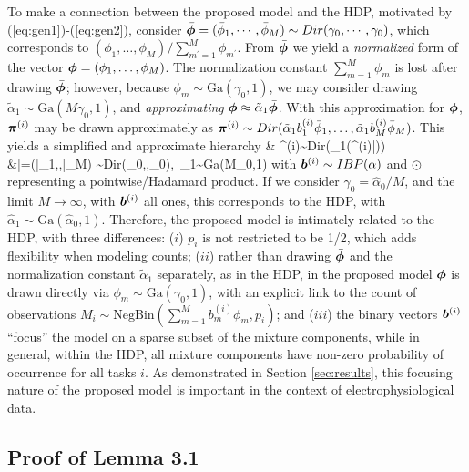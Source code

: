 \documentclass[journal]{IEEEtran}
\begin{document}
To make a connection between the proposed model and the HDP, motivated by (\ref{eq:gen1})-(\ref{eq:gen2}), consider $\bar{\boldsymbol{\phi}}=(\bar{\phi}_1,\cdots,\bar{\phi}_M) \sim \relax{Dir}(\gamma_0,\cdots,\gamma_0)$, which corresponds to $(\phi_1,\dots,\phi_M)/\sum_{m^\prime=1}^M \phi_{m^\prime}$. From $\bar{\boldsymbol{\phi}}$ we yield a \emph{normalized} form of the vector $\boldsymbol{\phi}=(\phi_1,\dots,\phi_M)$. The normalization constant $\sum_{m=1}^M\phi_m$ is lost after drawing $\bar{\boldsymbol{\phi}}$; however, because $\phi_m\sim\mbox{Ga}(\gamma_0,1)$, we may consider drawing $\tilde{\alpha}_1\sim\mbox{Ga}(M\gamma_0,1)$, and \emph{approximating} ${\boldsymbol{\phi}}\approx\tilde{\alpha}_1\bar{\boldsymbol{\phi}}$. With this approximation for $\boldsymbol{\phi}$, $\boldsymbol{\pi}^{(i)}$ may be drawn approximately as $\boldsymbol{\pi}^{(i)}\sim\relax{Dir}(\tilde{\alpha}_1b_1^{(i)}\bar{\phi}_1,\dots,\tilde{\alpha}_1b_M^{(i)}\bar{\phi}_M)$. This yields a simplified and approximate hierarchy
\beqs & \piv^{(i)}\sim\mbox{Dir}(\tilde{\alpha}_1(\bv^{(i)}\odot\bar{\phiv}))\\ &\bar{\phiv}=(\bar{\phi}_1,\cdots,\bar{\phi}_M) \sim \mbox{Dir}(\gamma_0,\cdots,\gamma_0),~\tilde{\alpha}_1\sim\mbox{Ga}(M\gamma_0,1)\nonumber\eeqs
with $\boldsymbol{b}^{(i)}\sim\relax{IBP}(\alpha)$ and $\odot$ representing a pointwise/Hadamard product. If we consider $\gamma_0=\hat{\alpha}_0/M$, and the limit $M\rightarrow\infty$, with $\boldsymbol{b}^{(i)}$ all ones, this corresponds to the HDP, with $\hat{\alpha}_1\sim\mbox{Ga}(\hat{\alpha}_0,1)$. 
Therefore, the proposed model is intimately related to the HDP, with three differences: ($i$) $p_i$ is not restricted to be 1/2, which adds flexibility when modeling counts; ($ii$) rather than drawing $\bar{\boldsymbol{\phi}}$ and the normalization constant $\tilde{\alpha}_1$ separately, as in the HDP, in the proposed model $\boldsymbol{\phi}$ is drawn directly via $\phi_m\sim\mbox{Ga}(\gamma_0,1)$, with an explicit link to the count of observations $M_i\sim\mbox{NegBin}(\sum_{m=1}^Mb_m^{(i)}\phi_m,p_i)$; and ($iii$) the binary vectors $\boldsymbol{b}^{(i)}$ ``focus'' the model on a sparse subset of the mixture components, while in general, within the HDP, all mixture components have non-zero probability of occurrence for all tasks $i$. As demonstrated in Section \ref{sec:results}, this focusing nature of the proposed model is important in the context of electrophysiological data.



\subsection{Proof of Lemma 3.1}
\end{document}
